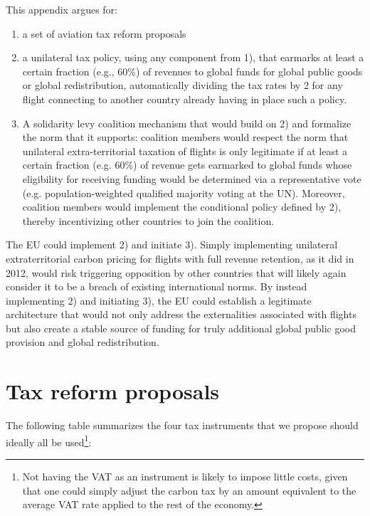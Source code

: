 This appendix argues for:
\begin{enumerate}
    \item a set of aviation tax reform proposals %
    \item a unilateral tax policy, using any component from 1), that earmarks at least a certain fraction (e.g., 60\%) of revenues to global funds for global public goods or global redistribution, automatically dividing the tax rates by 2 for any flight connecting to another country already having in place such a policy.
    \item A solidarity levy coalition mechanism that would build on 2) and formalize the norm that it supports: coalition members would respect the norm that unilateral extra-territorial taxation of flights is only legitimate if at least a certain fraction (e.g. 60\%) of revenue gets earmarked to global funds whose eligibility for receiving funding would be determined via a representative vote (e.g. population-weighted qualified majority voting at the UN). Moreover, coalition members would implement the conditional policy defined by 2), thereby incentivizing other countries to join the coalition.
\end{enumerate}


The EU could implement 2) and initiate 3). Simply implementing unilateral extraterritorial carbon pricing for flights with full revenue retention, as it did in 2012, would risk triggering opposition by other countries that will likely again consider it to be a breach of existing international norms. By instead implementing 2) and initiating 3), the EU could establish a legitimate architecture that would not only address the externalities associated with flights but also create a stable source of funding for truly additional global public good provision and global redistribution.


\section{Tax reform proposals}

The following table summarizes the four tax instruments that we propose should ideally all be used\footnote{Not having the VAT as an instrument is likely to impose little costs, given that one could simply adjust the carbon tax by an amount equivalent to the average VAT rate applied to the rest of the economy.}:

